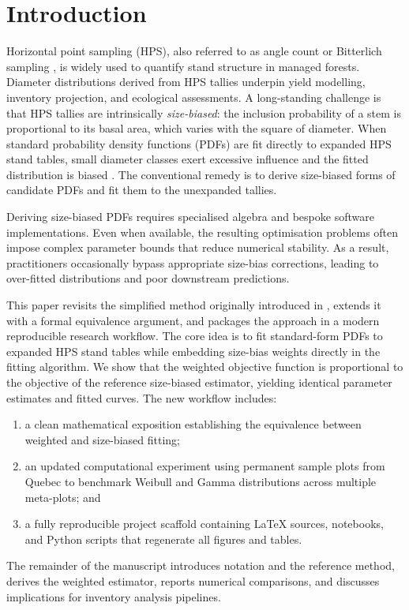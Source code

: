 \section{Introduction}

Horizontal point sampling (HPS), also referred to as angle count or Bitterlich
sampling \citep{bitterlich1947}, is widely used to quantify stand structure in
managed forests. Diameter distributions derived from HPS tallies underpin yield
modelling, inventory projection, and ecological assessments. A long-standing
challenge is that HPS tallies are intrinsically \emph{size-biased}: the
inclusion probability of a stem is proportional to its basal area, which varies
with the square of diameter. When standard probability density functions (PDFs)
are fit directly to expanded HPS stand tables, small diameter classes exert
excessive influence and the fitted distribution is biased \citep{van1986,
gove2000, ducey2015}. The conventional remedy is to derive size-biased forms of
candidate PDFs and fit them to the unexpanded tallies.

Deriving size-biased PDFs requires specialised algebra and bespoke software
implementations. Even when available, the resulting optimisation problems
often impose complex parameter bounds that reduce numerical stability. As a
result, practitioners occasionally bypass appropriate size-bias corrections,
leading to over-fitted distributions and poor downstream predictions.

This paper revisits the simplified method originally introduced in
\citet{paradis2019submitted}, extends it with a formal equivalence argument,
and packages the approach in a modern reproducible research workflow. The core
idea is to fit standard-form PDFs to expanded HPS stand tables while embedding
size-bias weights directly in the fitting algorithm. We show that the weighted
objective function is proportional to the objective of the reference
size-biased estimator, yielding identical parameter estimates and fitted
curves. The new workflow includes:
\begin{enumerate}
  \item a clean mathematical exposition establishing the equivalence between
  weighted and size-biased fitting;
  \item an updated computational experiment using permanent sample plots from
  Quebec to benchmark Weibull and Gamma distributions across multiple
  meta-plots; and
  \item a fully reproducible project scaffold containing LaTeX sources,
  notebooks, and Python scripts that regenerate all figures and tables.
\end{enumerate}

The remainder of the manuscript introduces notation and the reference method,
derives the weighted estimator, reports numerical comparisons, and discusses
implications for inventory analysis pipelines.
